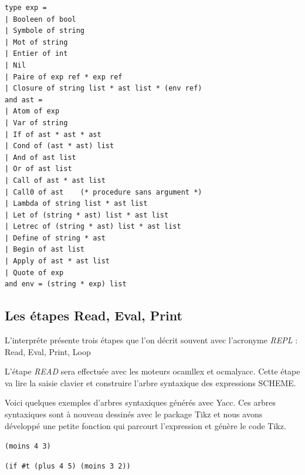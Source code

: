 \documentclass[11pt]{book}
\begin{document}
\begin{Verbatim}
type exp =
| Booleen of bool
| Symbole of string
| Mot of string
| Entier of int
| Nil
| Paire of exp ref * exp ref
| Closure of string list * ast list * (env ref)
and ast =
| Atom of exp
| Var of string
| If of ast * ast * ast
| Cond of (ast * ast) list
| And of ast list
| Or of ast list
| Call of ast * ast list
| Call0 of ast    (* procedure sans argument *)
| Lambda of string list * ast list   
| Let of (string * ast) list * ast list
| Letrec of (string * ast) list * ast list
| Define of string * ast
| Begin of ast list
| Apply of ast * ast list
| Quote of exp
and env = (string * exp) list
  \end{Verbatim}


\subsection{Les étapes Read, Eval, Print}
L'interpr\'{e}te pr\'{e}sente trois \'{e}tapes que l'on d\'{e}crit souvent avec l'acronyme \textit{REPL} :
Read, Eval, Print, Loop


L'étape \textit{READ}  sera effectuée avec les moteurs ocamllex et ocmalyacc.
Cette étape va lire la saisie clavier et construire l'arbre syntaxique des expressions SCHEME.

Voici quelques exemples d'arbres syntaxiques générés avec Yacc.
Ces arbres syntaxiques sont à nouveau dessinés avec le package Tikz et nous avons développé une petite
fonction qui parcourt l'expression et génère le code Tikz.

\verb+(moins 4 3)+
\begin{center}
\end{center}


\verb+(if #t (plus 4 5) (moins 3 2))+
\begin{center}
\end{center}
\end{document}
